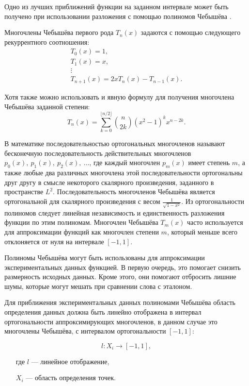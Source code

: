 Одно из лучших приближений функции на заданном интервале может быть получено при использовании разложения с помощью полиномов Чебышёва \cite{de1963functions}.

Многочлены Чебышёва первого рода $T_n (x)$ задаются с помощью следующего рекуррентного соотношения:
\begin{equation}
\begin{gathered}
T_0 (x) = 1, \\
T_1 (x) = x, \\
\vdots \\
T_{n+1} (x) = 2x T_n (x) - T_{n-1} (x).
\end{gathered}
\end{equation}

Хотя также можно использовать и явную формулу для получения многочлена Чебышёва заданной степени:
\begin{equation}
T_n (x) = \sum_{k=0}^{\lfloor n/2 \rfloor} \binom{n}{2k} (x^2 - 1)^k x^{n-2k}.
\end{equation}

В математике последовательностью ортогональных многочленов называют бесконечную последовательность действительных многочленов $p_{0}(x),\ p_{1}(x),\ p_{2}(x),\ \ldots$, где каждый многочлен $p_{m}(x)$ имеет степень $m$, а также любые два различных многочлена этой последовательности ортогональны друг другу в смысле некоторого скалярного произведения, заданного в пространстве $L^{2}$.
Последовательность многочленов Чебышёва является ортогональной для скалярного произведения с весом $\frac{1}{\sqrt{1-x^2}}$.
Из ортогональности полиномов следует линейная независимость и единственность разложения функции по этим полиномам.
Многочлен Чебышёва $T_{m}(x)$ часто используется для аппроксимации функций как многочлен степени $m$, который меньше всего отклоняется от нуля на интервале $[-1, 1]$.

Полиномы Чебышёва могут быть использованы для аппроксимации экспериментальных данных функцией.
В первую очередь, это помогает снизить размерность исходных данных.
Кроме этого, они помогают отбросить лишние шумы, которые могут мешать при сравнении слова с эталоном.

Для приближения экспериментальных данных полиномами Чебышёва область определения данных должна быть линейно отображена в интервал ортогональности аппроксимирующих многочленов, в данном случае это многочлены Чебышёва, с интервалом ортогональности $[-1, 1]$:

\begin{equation}
l: X_i \rightarrow [-1, 1],
\end{equation}
\begin{itemize}[align=left,leftmargin=1.8em,itemindent=0pt,labelsep=0pt,labelwidth=1.8em]
	\item[где] $l$ --- линейное отображение,
	\item[] $X_i$ --- область определения точек.
\end{itemize}

